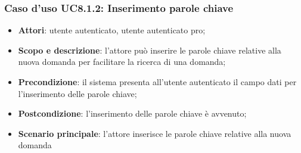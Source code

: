 	\subsubsection{Caso d'uso UC8.1.2: Inserimento parole chiave}
	\begin{itemize}
		\item
			\textbf{Attori}: utente autenticato, utente autenticato pro;
		\item
			\textbf{Scopo e descrizione}: l'attore può inserire le parole chiave relative alla nuova domanda per facilitare la ricerca di una domanda;
		\item		
			\textbf{Precondizione}: il sistema presenta all'utente autenticato il campo dati per l'inserimento delle parole chiave;
		\item
			\textbf{Postcondizione}: l'inserimento delle parole chiave è avvenuto;
		\item
			\textbf{Scenario principale}: l'attore inserisce le parole chiave relative alla nuova domanda	
	\end{itemize}


